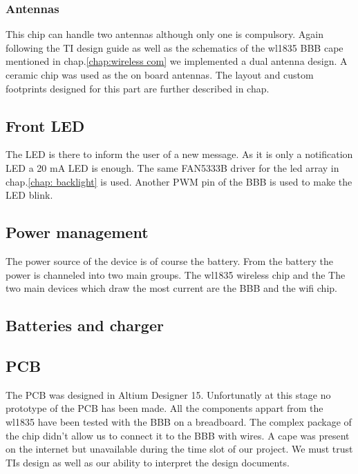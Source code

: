 \subsubsection{Antennas}
This chip can handle two antennas although only one is compulsory. Again following the TI design guide as well as the schematics of the wl1835 BBB cape mentioned in chap.\ref{chap:wireless com} we implemented a dual antenna design. A ceramic chip was used as the on board antennas. The layout and custom footprints designed for this part are further described in chap.
\subsection{Front LED}
The LED is there to inform the user of a new message. As it is only a notification LED a 20 mA LED is enough. The same FAN5333B driver for the led array in chap.\ref{chap: backlight} is used. Another PWM pin of the BBB is used to make the LED blink.
\subsection{Power management}
The power source of the device is of course the battery. From the battery the power is channeled into two main groups. The wl1835 wireless chip and the
The two main devices which draw the most current are the BBB and the wifi chip.
\subsection{Batteries and charger}
\subsection{PCB}
The PCB was designed in Altium Designer 15. Unfortunatly at this stage no prototype of the PCB has been made. All the components appart from the wl1835 have been tested with the BBB on a breadboard. The complex package of the chip didn't allow us to connect it to the BBB with wires. A cape was present on the internet but unavailable during the time slot of our project. We must trust TIs design as well as our ability to interpret the design documents.

